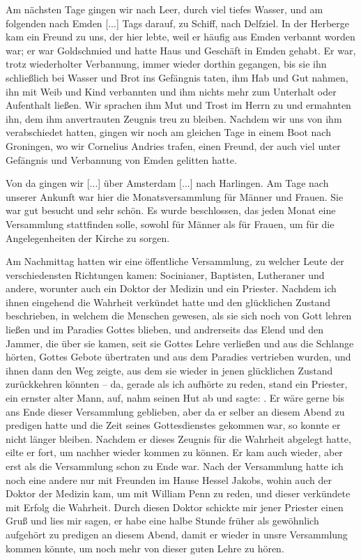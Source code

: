 Am nächsten Tage gingen wir nach Leer, durch viel tiefes
Wasser, und am folgenden nach Emden [...] Tags darauf, zu
Schiff, nach Delfziel. In der Herberge kam ein Freund zu uns,
der hier lebte, weil er häufig aus Emden verbannt worden war;
er war Goldschmied und hatte Haus und Geschäft in Emden gehabt. 
Er war, trotz wiederholter Verbannung, immer wieder
dorthin gegangen, bis sie ihn schließlich bei Wasser und Brot ins
Gefängnis taten, ihm Hab und Gut nahmen, ihn mit Weib und
Kind verbannten und ihm nichts mehr zum Unterhalt oder
Aufenthalt ließen. Wir sprachen ihm Mut und Trost im Herrn
zu und ermahnten ihn, dem ihm anvertrauten Zeugnis treu zu
bleiben. Nachdem wir uns von ihm verabschiedet hatten, gingen
wir noch am gleichen Tage in einem Boot nach Groningen, wo
wir Cornelius Andries trafen, 
einen Freund, der auch viel unter
Gefängnis und Verbannung von Emden gelitten hatte.

Von da gingen wir [...] über Amsterdam [...] nach Harlingen.
Am Tage nach unserer Ankunft war hier die Monatsversammlung
für Männer und Frauen. Sie war gut besucht und sehr schön.
Es wurde beschlossen, das jeden Monat eine Versammlung stattfinden 
solle, sowohl für Männer als für Frauen, um für die
Angelegenheiten der Kirche zu sorgen.

Am Nachmittag hatten wir eine öffentliche Versammlung,
zu welcher Leute der verschiedensten Richtungen kamen: 
Socinianer, Baptisten, 
Lutheraner und andere, worunter auch ein Doktor der
Medizin und ein Priester. Nachdem ich ihnen eingehend die
Wahrheit verkündet hatte und den glücklichen Zustand beschrieben,
in welchem die Menschen gewesen, als sie sich noch von Gott
lehren ließen und im Paradies Gottes blieben, und andrerseits
das Elend und den Jammer, die über sie kamen, seit sie Gottes
Lehre verließen und aus die Schlange hörten, Gottes Gebote 
übertraten und aus dem Paradies vertrieben wurden, und ihnen dann
den Weg zeigte, aus dem sie wieder in jenen glücklichen Zustand
zurückkehren könnten -- da, gerade als ich aufhörte zu reden,
stand ein Priester, ein ernster alter Mann, auf, nahm seinen Hut
ab und sagte: .
Er wäre gerne bis ans Ende dieser Versammlung geblieben, aber
da er selber an diesem Abend zu predigen hatte und die Zeit
seines Gottesdienstes gekommen war, so konnte er nicht länger
bleiben. Nachdem er dieses Zeugnis für die Wahrheit abgelegt
hatte, eilte er fort, um nachher wieder kommen zu können. Er
kam auch wieder, aber erst als die Versammlung schon zu Ende
war. Nach der Versammlung hatte ich noch eine andere nur mit
Freunden im Hause Hessel Jakobs, 
wohin auch der Doktor der
Medizin kam, um mit William Penn zu reden, 
und dieser verkündete mit Erfolg die Wahrheit. Durch diesen Doktor schickte
mir jener Priester einen Gruß und lies mir sagen, er habe eine
halbe Stunde früher als gewöhnlich aufgehört zu predigen an
diesem Abend, damit er wieder in unsre Versammlung kommen
könnte, um noch mehr von dieser guten Lehre zu hören.